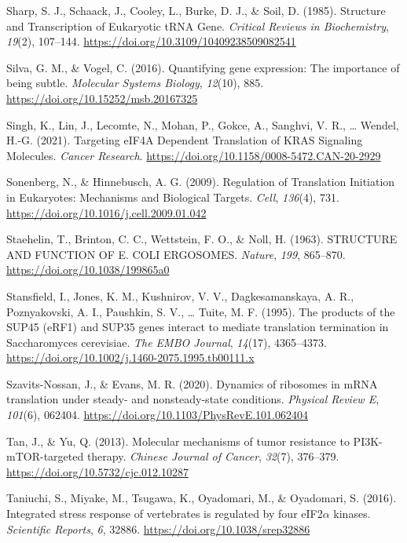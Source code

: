 \documentclass[12pt,openany]{book}
\begin{document}
\hypertarget{ref-Sharp1985}{}
Sharp, S. J., Schaack, J., Cooley, L., Burke, D. J., \& Soil, D. (1985).
Structure and Transcription of Eukaryotic tRNA Gene. \emph{Critical
Reviews in Biochemistry}, \emph{19}(2), 107--144.
\url{https://doi.org/10.3109/10409238509082541}

\hypertarget{ref-Silva2016}{}
Silva, G. M., \& Vogel, C. (2016). Quantifying gene expression: The
importance of being subtle. \emph{Molecular Systems Biology},
\emph{12}(10), 885. \url{https://doi.org/10.15252/msb.20167325}

\hypertarget{ref-Singh2021}{}
Singh, K., Lin, J., Lecomte, N., Mohan, P., Gokce, A., Sanghvi, V. R.,
\ldots{} Wendel, H.-G. (2021). Targeting eIF4A Dependent Translation of
KRAS Signaling Molecules. \emph{Cancer Research}.
\url{https://doi.org/10.1158/0008-5472.CAN-20-2929}

\hypertarget{ref-Sonenberg2009}{}
Sonenberg, N., \& Hinnebusch, A. G. (2009). Regulation of Translation
Initiation in Eukaryotes: Mechanisms and Biological Targets.
\emph{Cell}, \emph{136}(4), 731.
\url{https://doi.org/10.1016/j.cell.2009.01.042}

\hypertarget{ref-Staehelin1963a}{}
Staehelin, T., Brinton, C. C., Wettstein, F. O., \& Noll, H. (1963).
STRUCTURE AND FUNCTION OF E. COLI ERGOSOMES. \emph{Nature}, \emph{199},
865--870. \url{https://doi.org/10.1038/199865a0}

\hypertarget{ref-Stansfield1995}{}
Stansfield, I., Jones, K. M., Kushnirov, V. V., Dagkesamanskaya, A. R.,
Poznyakovski, A. I., Paushkin, S. V., \ldots{} Tuite, M. F. (1995). The
products of the SUP45 (eRF1) and SUP35 genes interact to mediate
translation termination in Saccharomyces cerevisiae. \emph{The EMBO
Journal}, \emph{14}(17), 4365--4373.
\url{https://doi.org/10.1002/j.1460-2075.1995.tb00111.x}

\hypertarget{ref-Szavits-Nossan2020b}{}
Szavits-Nossan, J., \& Evans, M. R. (2020). Dynamics of ribosomes in
mRNA translation under steady- and nonsteady-state conditions.
\emph{Physical Review E}, \emph{101}(6), 062404.
\url{https://doi.org/10.1103/PhysRevE.101.062404}

\hypertarget{ref-Tan2013}{}
Tan, J., \& Yu, Q. (2013). Molecular mechanisms of tumor resistance to
PI3K-mTOR-targeted therapy. \emph{Chinese Journal of Cancer},
\emph{32}(7), 376--379. \url{https://doi.org/10.5732/cjc.012.10287}

\hypertarget{ref-Taniuchi2016}{}
Taniuchi, S., Miyake, M., Tsugawa, K., Oyadomari, M., \& Oyadomari, S.
(2016). Integrated stress response of vertebrates is regulated by four
eIF2\(\alpha\) kinases. \emph{Scientific Reports}, \emph{6}, 32886.
\url{https://doi.org/10.1038/srep32886}
\end{document}
